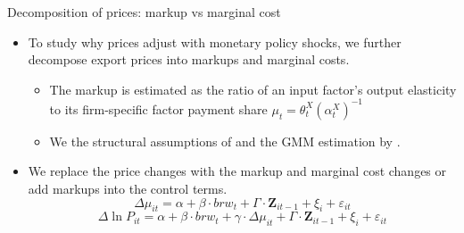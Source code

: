 \documentclass[10pt]{beamer}
\begin{document}
\begin{frame}{Decomposition of prices: markup vs marginal cost}
    \begin{itemize}
        \item To study why prices adjust with monetary policy shocks, we further decompose export prices into markups and marginal costs.
        \begin{itemize}
            \item The markup is estimated as the ratio of an input factor's output elasticity to its firm-specific factor payment share $\mu_{t}=\theta_{t}^{X}\left(\alpha_{t}^{X}\right)^{-1}$
            \item We the structural assumptions of \cite{deloecker2012markups} and the GMM estimation by \cite{brooks2021agglomeration}.
        \end{itemize}
        \item We replace the price changes with the markup and marginal cost changes or add markups into the control terms. 
        \begin{equation}
            \Delta \mu_{it} = \alpha +\beta \cdot brw_{t}+ \Gamma \cdot \textbf{Z}_{it-1}+\xi_{i}+\varepsilon_{it} \label{reg.markup}
        \end{equation}
        \begin{equation}
            \Delta \ln P_{it} = \alpha+\beta \cdot brw_{t}+ \gamma \cdot \Delta \mu_{it}+ \Gamma \cdot \textbf{Z}_{it-1}+\xi_{i}+\varepsilon_{i t} \label{reg.markup_int}
        \end{equation}
    \end{itemize}
\end{frame}
\end{document}
